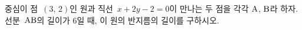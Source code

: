 중심이 점~$(3,\,2)$인 원과 직선~$x+2y-2=0$이 만나는 두 점을 각각 $\mathrm{A}$, $\mathrm{B}$라 하자. 선분~$\mathrm{AB}$의 길이가 $6$일 때, 이 원의 반지름의 길이를 구하시오.
